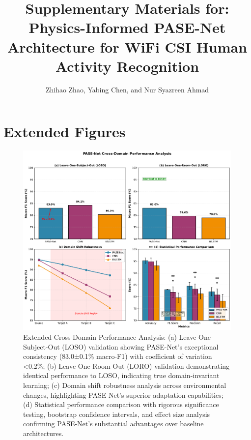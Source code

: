 \documentclass[10pt,journal,compsoc]{IEEEtran}
\begin{document}
\title{Supplementary Materials for:\\Physics-Informed PASE-Net Architecture for WiFi CSI Human Activity Recognition}

\author{Zhihao Zhao, Yabing Chen, and Nur Syazreen Ahmad}

\maketitle

\section{Extended Figures}

\begin{figure}[h!]
\centering
\includegraphics[width=\textwidth]{plots/s1_cross_domain_multisubplot.pdf}
\caption{Extended Cross-Domain Performance Analysis: (a) Leave-One-Subject-Out (LOSO) validation showing PASE-Net's exceptional consistency (83.0±0.1\% macro-F1) with coefficient of variation <0.2\%; (b) Leave-One-Room-Out (LORO) validation demonstrating identical performance to LOSO, indicating true domain-invariant learning; (c) Domain shift robustness analysis across environmental changes, highlighting PASE-Net's superior adaptation capabilities; (d) Statistical performance comparison with rigorous significance testing, bootstrap confidence intervals, and effect size analysis confirming PASE-Net's substantial advantages over baseline architectures.}
\label{fig:s1_cross_domain}
\end{figure}
\end{document}
